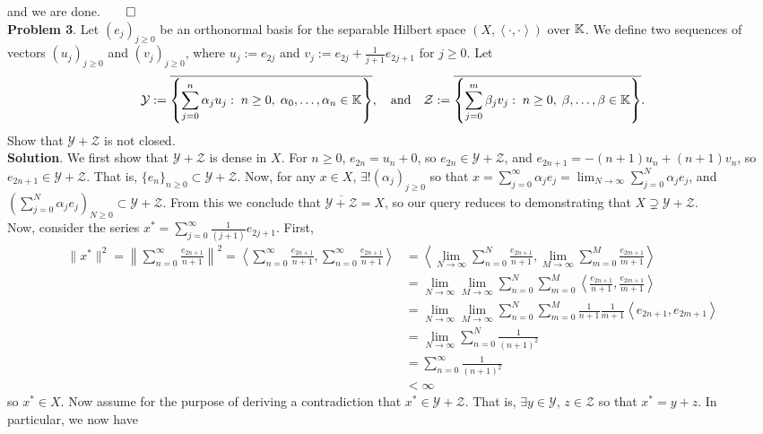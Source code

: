 \documentclass[10pt]{article}
\newcommand{\1}[1]{\mathbbm{1}_{#1}} \newcommand{\mc}[1]{\mathcal{#1}}
\newcommand{\ip}[2]{\left\langle#1,#2\right\rangle }
\begin{document}
    and we are done.\hfill{$\qed$}\\[5pt]
    {\bf Problem 3}. Let $(e_j)_{j\geq 0}$ be an orthonormal basis for the separable Hilbert space $(X,\ip{\cdot}{\cdot})$ over $\mathbb{K}$. We define two
    sequences of vectors $(u_j)_{j\geq 0}$ and $(v_j)_{j\geq 0}$, where $u_j:=e_{2j}$ and $v_j:=e_{2j}+\frac{1}{j+1}e_{2j+1}$ for $j\geq 0$. Let
    \begin{align*}
        \mc{Y}:=\overline{\left\{\sum_{j=0}^n\alpha_ju_j:\;n\geq 0,\;\alpha_0,\dots,\alpha_n\in\mbb{K}\right\}},\quad\text{and}\quad \mc{Z}:=\overline{\left\{\sum_{j=0}^m\beta_jv_j:\;n\geq 0,\;\beta,\dots,\beta\in\mbb{K}\right\}}.
    \end{align*}
    Show that $\mc{Y}+\mc{Z}$ is not closed.\\[5pt]
    {\bf Solution}. We first show that $\mc{Y}+\mc{Z}$ is dense in $X$. For $n\geq 0$, $e_{2n}=u_n+0$, so $e_{2n}\in\mc{Y}+\mc{Z}$, and $e_{2n+1}=-(n+1)u_n+(n+1)v_n$, so $e_{2n+1}\in\mc{Y}+\mc{Z}$. That is, $\{e_n\}_{n\geq 0}\subset \mc{Y}+\mc{Z}$.
    Now, for any $x\in X$, $\exists!(\alpha_j)_{j\geq 0}$ so that $x=\sum_{j=0}^\infty\alpha_je_j=\lim_{N\rightarrow\infty}\sum_{j=0}^N\alpha_je_j$, and $(\sum_{j=0}^N\alpha_je_j)_{N\geq 0}\subset \mc{Y}+\mc{Z}$. From this we conclude that $\overline{\mc{Y}+\mc{Z}}=X$, so our query reduces to
    demonstrating that $X\supsetneq\mc{Y}+\mc{Z}$.\\[5pt]
    Now, consider the series $x^\ast=\sum_{j=0}^\infty\frac{1}{(j+1)}e_{2j+1}$. First,
    \begin{align*}
        \|x^\ast\|^2=\left\|\sum_{n=0}^\infty\frac{e_{2n+1}}{n+1}\right\|^2=\ip{\sum_{n=0}^\infty\frac{e_{2n+1}}{n+1}}{\sum_{n=0}^\infty\frac{e_{2n+1}}{n+1}}&=\ip{\lim_{N\rightarrow\infty}\sum_{n=0}^N\frac{e_{2n+1}}{n+1}}{\lim_{M\rightarrow\infty}\sum_{m=0}^M\frac{e_{2m+1}}{m+1}}\\
        &=\lim_{N\rightarrow\infty}\lim_{M\rightarrow\infty}\sum_{n=0}^N\sum_{m=0}^M\ip{\frac{e_{2n+1}}{n+1}}{\frac{e_{2m+1}}{m+1}}\\
        &=\lim_{N\rightarrow\infty}\lim_{M\rightarrow\infty}\sum_{n=0}^N\sum_{m=0}^M\frac{1}{n+1}\frac{1}{m+1}\ip{e_{2n+1}}{e_{2m+1}}\\
        &=\lim_{N\rightarrow\infty}\sum_{n=0}^N\frac{1}{(n+1)^2}\\
        &=\sum_{n=0}^\infty\frac{1}{(n+1)^2}\tag{1}\\
        &<\infty
    \end{align*}
    so $x^\ast\in X$. Now assume for the purpose of deriving a contradiction that $x^\ast\in\mc{Y}+\mc{Z}$. That is, $\exists y\in\mc{Y}$, $z\in\mc{Z}$ so that $x^\ast=y+z$. In particular, we now have
\end{document}
